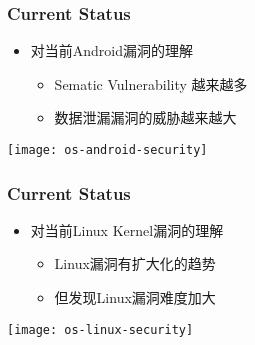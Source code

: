 \begin{frame}[plain]	
	\frametitle{Current Status}
	
	\begin{itemize}\large
		\item 对当前Android漏洞的理解
		\begin{itemize}\large
			\item Sematic Vulnerability 越来越多
			\item 数据泄漏漏洞的威胁越来越大
		\end{itemize}
		
		
	\end{itemize}	
	
	\centering
	\texttt{[image: os-android-security]}
	
\end{frame}

\begin{frame}[plain]	
	\frametitle{Current Status}
	
	\begin{itemize}\large
		\item 对当前Linux Kernel漏洞的理解
		\begin{itemize}\large
			\item Linux漏洞有扩大化的趋势
			\item 但发现Linux漏洞难度加大
		\end{itemize}
		
		
	\end{itemize}	
	
	\centering
	\texttt{[image: os-linux-security]}
	
\end{frame}
